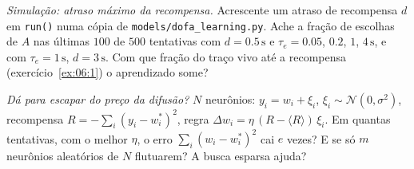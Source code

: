 \begin{exercise}[\lvlB]
\label{ex:06:7}
\emph{Simulação: atraso máximo da recompensa.} Acrescente um atraso de recompensa $d$ em \texttt{run()} numa cópia de \texttt{models/\allowbreak dofa\_learning.py}. Ache a fração de escolhas de $A$ nas últimas $100$ de $500$ tentativas com $d=0.5\,\text{s}$ e $\tau_e=0.05$, $0.2$, $1$, $4\,\text{s}$, e com $\tau_e=1\,\text{s}$, $d=3\,\text{s}$. Com que fração do traço vivo até a recompensa (exercício~\ref{ex:06:1}) o aprendizado some?
\end{exercise}

\begin{exercise}[\lvlC]
\label{ex:06:8}
\emph{Dá para escapar do preço da difusão?} $N$ neurônios: $y_i=w_i+\xi_i$, $\xi_i\sim\mathcal N(0,\sigma^2)$, recompensa $R=-\sum_i(y_i-w_i^*)^2$, regra $\Delta w_i=\eta\,(R-\langle R\rangle)\,\xi_i$. Em quantas tentativas, com o melhor $\eta$, o erro $\sum_i(w_i-w_i^*)^2$ cai $e$ vezes? E se só $m$ neurônios aleatórios de $N$ flutuarem? A busca esparsa ajuda?
\end{exercise}
